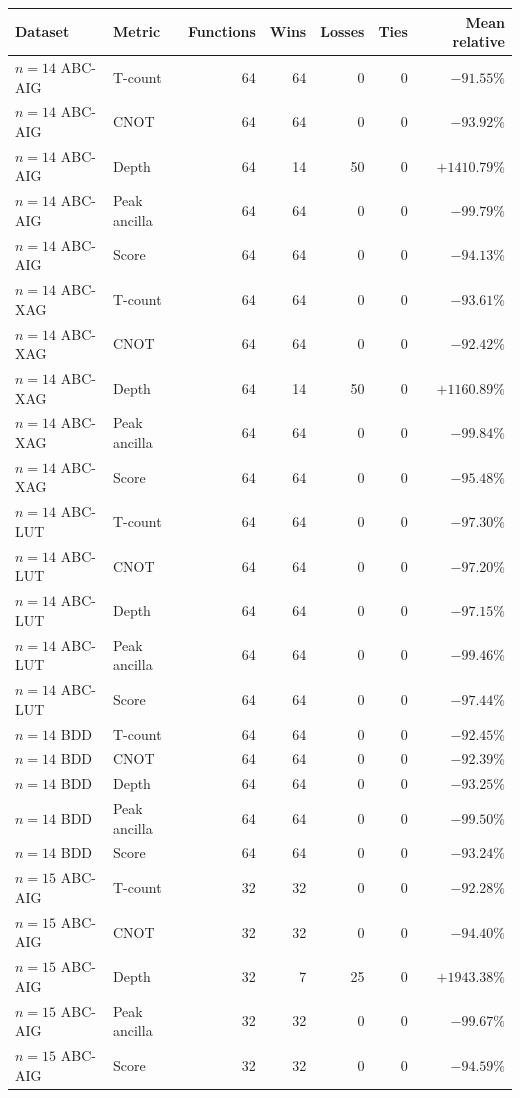 \begin{tabular}{llrrrrr}
\toprule
Dataset & Metric & Functions & Wins & Losses & Ties & Mean relative \\
\midrule
$n=14$ ABC-AIG & T-count & 64 & 64 & 0 & 0 & $-91.55\%$ \\
$n=14$ ABC-AIG & CNOT & 64 & 64 & 0 & 0 & $-93.92\%$ \\
$n=14$ ABC-AIG & Depth & 64 & 14 & 50 & 0 & $+1410.79\%$ \\
$n=14$ ABC-AIG & Peak ancilla & 64 & 64 & 0 & 0 & $-99.79\%$ \\
$n=14$ ABC-AIG & Score & 64 & 64 & 0 & 0 & $-94.13\%$ \\
$n=14$ ABC-XAG & T-count & 64 & 64 & 0 & 0 & $-93.61\%$ \\
$n=14$ ABC-XAG & CNOT & 64 & 64 & 0 & 0 & $-92.42\%$ \\
$n=14$ ABC-XAG & Depth & 64 & 14 & 50 & 0 & $+1160.89\%$ \\
$n=14$ ABC-XAG & Peak ancilla & 64 & 64 & 0 & 0 & $-99.84\%$ \\
$n=14$ ABC-XAG & Score & 64 & 64 & 0 & 0 & $-95.48\%$ \\
$n=14$ ABC-LUT & T-count & 64 & 64 & 0 & 0 & $-97.30\%$ \\
$n=14$ ABC-LUT & CNOT & 64 & 64 & 0 & 0 & $-97.20\%$ \\
$n=14$ ABC-LUT & Depth & 64 & 64 & 0 & 0 & $-97.15\%$ \\
$n=14$ ABC-LUT & Peak ancilla & 64 & 64 & 0 & 0 & $-99.46\%$ \\
$n=14$ ABC-LUT & Score & 64 & 64 & 0 & 0 & $-97.44\%$ \\
$n=14$ BDD & T-count & 64 & 64 & 0 & 0 & $-92.45\%$ \\
$n=14$ BDD & CNOT & 64 & 64 & 0 & 0 & $-92.39\%$ \\
$n=14$ BDD & Depth & 64 & 64 & 0 & 0 & $-93.25\%$ \\
$n=14$ BDD & Peak ancilla & 64 & 64 & 0 & 0 & $-99.50\%$ \\
$n=14$ BDD & Score & 64 & 64 & 0 & 0 & $-93.24\%$ \\
$n=15$ ABC-AIG & T-count & 32 & 32 & 0 & 0 & $-92.28\%$ \\
$n=15$ ABC-AIG & CNOT & 32 & 32 & 0 & 0 & $-94.40\%$ \\
$n=15$ ABC-AIG & Depth & 32 & 7 & 25 & 0 & $+1943.38\%$ \\
$n=15$ ABC-AIG & Peak ancilla & 32 & 32 & 0 & 0 & $-99.67\%$ \\
$n=15$ ABC-AIG & Score & 32 & 32 & 0 & 0 & $-94.59\%$ \\

\end{tabular}
